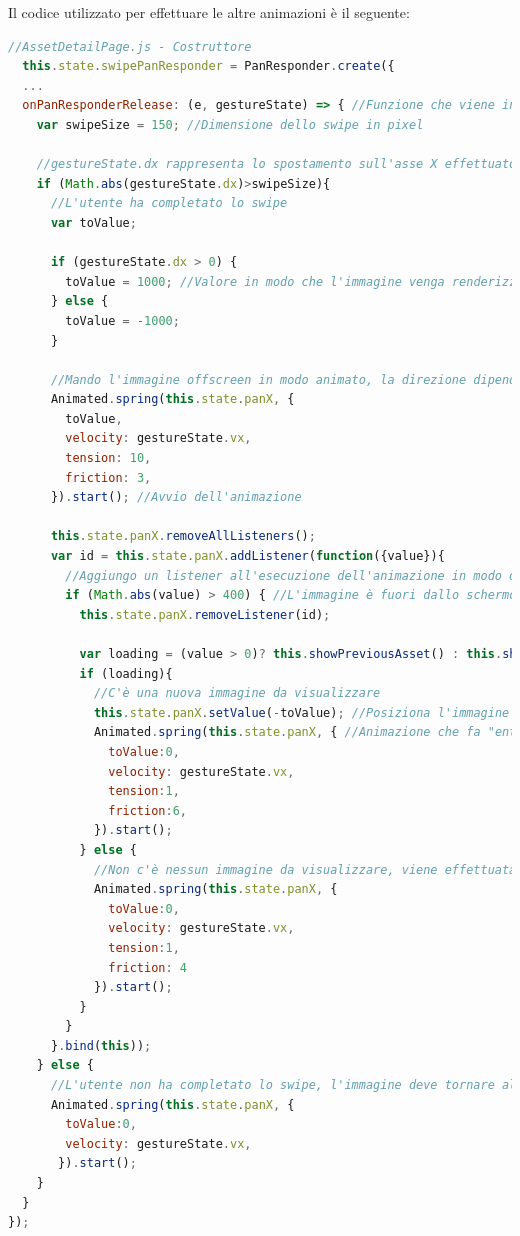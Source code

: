 Il codice utilizzato per effettuare le altre animazioni è il seguente:
\begin{lstlisting}[language=JavaScript, caption=AssetDetailPage - Animazione dello swipe]
//AssetDetailPage.js - Costruttore
  this.state.swipePanResponder = PanResponder.create({
  ...
  onPanResponderRelease: (e, gestureState) => { //Funzione che viene invocata quando l'utente termina la gesture
    var swipeSize = 150; //Dimensione dello swipe in pixel
    
    //gestureState.dx rappresenta lo spostamento sull'asse X effettuato dall'utente
    if (Math.abs(gestureState.dx)>swipeSize){
      //L'utente ha completato lo swipe
      var toValue;
      
      if (gestureState.dx > 0) {
        toValue = 1000; //Valore in modo che l'immagine venga renderizzata offscreen
      } else {
        toValue = -1000;
      }
     
      //Mando l'immagine offscreen in modo animato, la direzione dipende dalla direzione della gesture (segno di gestureState.dx)
      Animated.spring(this.state.panX, {
        toValue,
        velocity: gestureState.vx,
        tension: 10,
        friction: 3,
      }).start(); //Avvio dell'animazione
      
      this.state.panX.removeAllListeners();
      var id = this.state.panX.addListener(function({value}){ 
      	//Aggiungo un listener all'esecuzione dell'animazione in modo di riuscire a capire quando l'immagine è finita fuori dallo schermo
        if (Math.abs(value) > 400) { //L'immagine è fuori dallo schermo
          this.state.panX.removeListener(id);
          
          var loading = (value > 0)? this.showPreviousAsset() : this.showNextAsset();
          if (loading){
            //C'è una nuova immagine da visualizzare
            this.state.panX.setValue(-toValue); //Posiziona l'immagine dalla parte opposta dello schermo
            Animated.spring(this.state.panX, { //Animazione che fa "entrare" la nuova immagine dalla parte opposta dello schermo
              toValue:0,
              velocity: gestureState.vx,
              tension:1,
              friction:6,
            }).start();
          } else {
          	//Non c'è nessun immagine da visualizzare, viene effettuata l'animazione che riporta l'immagine alla posizione iniziale
            Animated.spring(this.state.panX, {
              toValue:0,
              velocity: gestureState.vx,
              tension:1,
              friction: 4
            }).start();
          }
        }
      }.bind(this));
    } else {
      //L'utente non ha completato lo swipe, l'immagine deve tornare alla posizione iniziale in modo animato
      Animated.spring(this.state.panX, {
        toValue:0,
        velocity: gestureState.vx,
       }).start();
    }
  }
});
\end{lstlisting}

